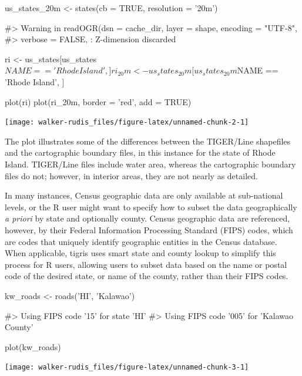 \begin{Schunk}
\begin{Sinput}
us_states_20m <- states(cb = TRUE, resolution = '20m')
\end{Sinput}
\begin{Soutput}
#> Warning in readOGR(dsn = cache_dir, layer = shape, encoding = "UTF-8",
#> verbose = FALSE, : Z-dimension discarded
\end{Soutput}
\begin{Sinput}
ri <- us_states[us_states$NAME == 'Rhode Island', ]
ri_20m <- us_states_20m[us_states_20m$NAME == 'Rhode Island', ]

plot(ri)
plot(ri_20m, border = 'red', add = TRUE)
\end{Sinput}

\texttt{[image: walker-rudis\_files/figure-latex/unnamed-chunk-2-1]} \end{Schunk}

The plot illustrates some of the differences between the TIGER/Line
shapefiles and the cartographic boundary files, in this instance for the
state of Rhode Island. TIGER/Line files include water area, whereas the
cartographic boundary files do not; however, in interior areas, they are
not nearly as detailed.

In many instances, Census geographic data are only available at
sub-national levels, or the R user might want to specify how to subset
the data geographically \emph{a priori} by state and optionally county.
Census geographic data are referenced, however, by their Federal
Information Processing Standard (FIPS) codes, which are codes that
uniquely identify geographic entities in the Census database. When
applicable, tigris uses smart state and county lookup to simplify this
process for R users, allowing users to subset data based on the name or
postal code of the desired state, or name of the county, rather than
their FIPS codes.

\begin{Schunk}
\begin{Sinput}
kw_roads <- roads('HI', 'Kalawao')
\end{Sinput}
\begin{Soutput}
#> Using FIPS code '15' for state 'HI'
#> Using FIPS code '005' for 'Kalawao County'
\end{Soutput}
\begin{Sinput}
plot(kw_roads)
\end{Sinput}

\texttt{[image: walker-rudis\_files/figure-latex/unnamed-chunk-3-1]} \end{Schunk}

